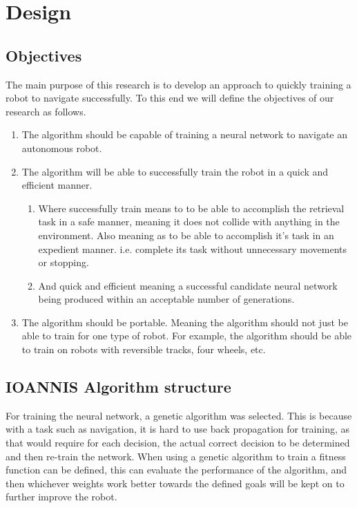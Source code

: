 \section{Design}
\subsection{Objectives}
The main purpose of this research is to develop an approach to quickly training a robot to navigate successfully. To this end we will define the objectives of our research as follows.
\begin{enumerate}
	\item The algorithm should be capable of training a neural network to navigate an autonomous robot.
	\item The algorithm will be able to successfully train the robot in a quick and efficient manner. 
	\begin{enumerate}
		\item Where successfully train means to to be able to accomplish the retrieval task in a safe manner, meaning it does not collide with anything in the environment. Also meaning as to be able to accomplish it's task in an expedient manner. i.e. complete its task without unnecessary movements or stopping.
		\item And quick and efficient meaning a successful candidate neural network being produced within an acceptable number of generations. 
	\end{enumerate}
	\item The algorithm should be portable. Meaning the algorithm should not just be able to train for one type of robot. For example, the algorithm should be able to train on robots with reversible tracks, four wheels, etc.
\end{enumerate}

\subsection{IOANNIS Algorithm structure}
For training the neural network, a genetic algorithm was selected. This is because with a task such as navigation, it is hard to use back propagation for training, as that would require for each decision, the actual correct decision to be determined and then re-train the network. When using a genetic algorithm to train a fitness function can be defined, this can evaluate the performance of the algorithm, and then whichever weights work better towards the defined goals will be kept on to further improve the robot. 


